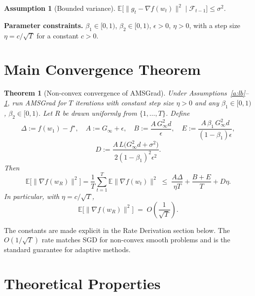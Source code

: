 \documentclass[11pt]{article}
\newtheorem{theorem}{Theorem}
\newtheorem{assumption}{Assumption}
\begin{document}
\begin{assumption}[Bounded variance]\label{a:var}
$\mathbb{E}\big[\|g_t-\nabla f(w_t)\|^2 \mid \mathcal{F}_{t-1}\big]\le \sigma^2$.
\end{assumption}

\textbf{Parameter constraints.} $\beta_1\in[0,1)$, $\beta_2\in[0,1)$,
$\epsilon>0$, $\eta>0$, with a step size $\eta = c/\sqrt{T}$ for a constant $c>0$.

\section*{Main Convergence Theorem}

\begin{theorem}[Non-convex convergence of AMSGrad]\label{thm:main}
Under Assumptions~\ref{a:lb}--\ref{a:var}, run AMSGrad for $T$ iterations with
constant step size $\eta>0$ and any $\beta_1\in[0,1)$, $\beta_2\in[0,1)$. Let
$R$ be drawn uniformly from $\{1,\dots,T\}$. Define
\[
\Delta := f(w_1)-f^\star,\quad A := G_\infty+\epsilon,\quad
B := \frac{A\,G_\infty^2 d}{\epsilon},\quad
E := \frac{A\,\beta_1\,G_\infty^2 d}{(1-\beta_1)\epsilon},
\]
\[
D := \frac{A\,L\big(G_\infty^2 d+\sigma^2\big)}{2(1-\beta_1)^2\epsilon^2}.
\]
Then
\[
\mathbb{E}\big[\|\nabla f(w_R)\|^2\big]
=\frac1T\sum_{t=1}^T\mathbb{E}\|\nabla f(w_t)\|^2
\;\le\;
\frac{A\Delta}{\eta T} + \frac{B+E}{T} + D\eta .
\]
In particular, with $\eta = c/\sqrt{T}$,
\[
\boxed{\;\mathbb{E}\big[\|\nabla f(w_R)\|^2\big]
\;=\; O\!\left(\frac{1}{\sqrt{T}}\right).\;}
\]
\end{theorem}

The constants are made explicit in the Rate Derivation section below. The
$O(1/\sqrt T)$ rate matches SGD for non-convex smooth problems and is the
standard guarantee for adaptive methods.

\section*{Theoretical Properties}
\end{document}
